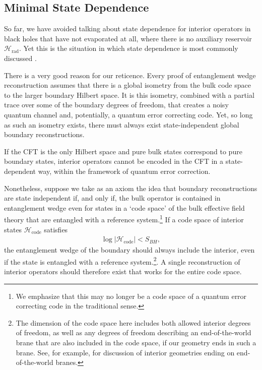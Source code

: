 \documentclass[11pt,a4paper]{article}
\begin{document}
\subsection{Minimal State Dependence} \label{sec:minimal}

So far, we have avoided talking about state dependence for interior operators in black holes that have not evaporated at all, where there is no auxiliary reservoir $\mathcal{H}_\text{rad}$. Yet this is the situation in which state dependence is most commonly discussed \cite{papadodimas2013infalling, papadodimas2014state, kourkoulou2017pure}.

There is a very good reason for our reticence. Every proof of entanglement wedge reconstruction assumes that there is a global isometry from the bulk code space to the larger boundary Hilbert space. It is this isometry, combined with a partial trace over some of the boundary degrees of freedom, that creates a noisy quantum channel and, potentially, a quantum error correcting code. Yet, so long as such an isometry exists, there must always exist state-independent global boundary reconstructions. 

If the CFT is the only Hilbert space and pure bulk states correspond to pure boundary states, interior operators cannot be encoded in the CFT in a state-dependent way, within the framework of quantum error correction.

Nonetheless, suppose we take as an axiom the idea that boundary reconstructions are state independent if, and only if, the bulk operator is contained in entanglement wedge even for states in a `code space' of the bulk effective field theory that are entangled with a reference system.\footnote{We emphasize that this may no longer be a code space of a quantum error correcting code in the traditional sense.} If a code space of interior states $\mathcal{H}_\text{code}$ satisfies
\begin{align}\label{eq:smallenoughspace}
\log |\mathcal{H}_\text{code}| < S_{BH},
\end{align}
the entanglement wedge of the boundary should always include the interior, even if the state is entangled with a reference system.\footnote{The dimension of the code space here includes both allowed interior degrees of freedom, as well as any degrees of freedom describing an end-of-the-world brane that are also included in the code space, if our geometry ends in such a brane. See, for example, \cite{kourkoulou2017pure, cooper2018black} for discussion of interior geometries ending on end-of-the-world branes.}. A single reconstruction of interior operators should therefore exist that works for the entire code space.
\end{document}
